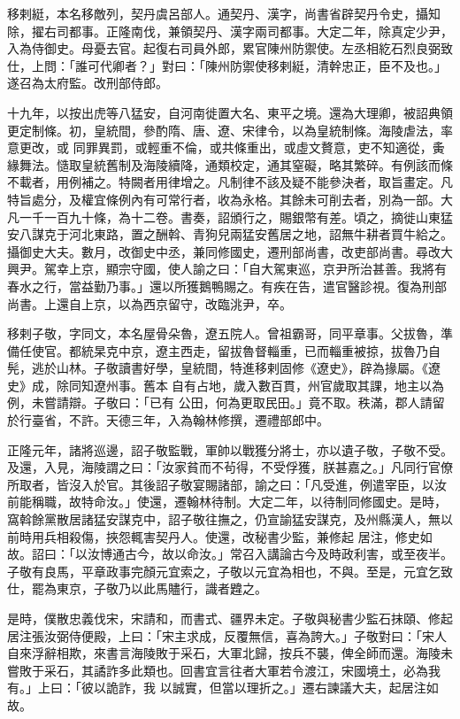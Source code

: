 \begin{pinyinscope}
 移剌綎，本名移敵列，契丹虞呂部人。通契丹、漢字，尚書省辟契丹令史，攝知除，擢右司都事。正隆南伐，兼領契丹、漢字兩司都事。大定二年，除真定少尹，入為侍御史。母憂去官。起復右司員外郎，累官陳州防禦使。左丞相紇石烈良弼致仕，上問：「誰可代卿者？」對曰：「陳州防禦使移剌綎，清幹忠正，臣不及也。」遂召為太府監。改刑部侍郎。



 十九年，以按出虎等八猛安，自河南徙置大名、東平之境。還為大理卿，被詔典領更定制條。初，皇統間，參酌隋、唐、遼、宋律令，以為皇統制條。海陵虐法，率意更改，或
 同罪異罰，或輕重不倫，或共條重出，或虛文贅意，吏不知適從，夤緣舞法。慥取皇統舊制及海陵續降，通類校定，通其窒礙，略其繁碎。有例該而條不載者，用例補之。特闕者用律增之。凡制律不該及疑不能參決者，取旨畫定。凡特旨處分，及權宜條例內有可常行者，收為永格。其餘未可削去者，別為一部。大凡一千一百九十條，為十二卷。書奏，詔頒行之，賜銀幣有差。頃之，摘徙山東猛安八謀克于河北東路，置之酬斡、青狗兒兩猛安舊居之地，詔無牛耕者買牛給之。攝御史大夫。數月，改御史中丞，兼同修國史，遷刑部尚書，改吏部尚書。尋改大
 興尹。駕幸上京，顯宗守國，使人諭之曰：「自大駕東巡，京尹所治甚善。我將有春水之行，當益勤乃事。」還以所獲鵝鴨賜之。有疾在告，遣官醫診視。復為刑部尚書。上還自上京，以為西京留守，改臨洮尹，卒。



 移剌子敬，字同文，本名屋骨朵魯，遼五院人。曾祖霸哥，同平章事。父拔魯，準備任使官。都統杲克中京，遼主西走，留拔魯督輜重，已而輜重被掠，拔魯乃自髡，逃於山林。子敬讀書好學，皇統間，特進移剌固修《遼史》，辟為掾屬。《遼史》成，除同知遼州事。舊本自有占地，歲入數百貫，州官歲取其課，地主以為例，未嘗請辯。子敬曰：「已有
 公田，何為更取民田。」竟不取。秩滿，郡人請留於行臺省，不許。天德三年，入為翰林修撰，遷禮部郎中。



 正隆元年，諸將巡邊，詔子敬監戰，軍帥以戰獲分將士，亦以遺子敬，子敬不受。及還，入見，海陵謂之曰：「汝家貧而不茍得，不受俘獲，朕甚嘉之。」凡同行官僚所取者，皆沒入於官。其後詔子敬宴賜諸部，諭之曰：「凡受進，例遣宰臣，以汝前能稱職，故特命汝。」使還，遷翰林待制。大定二年，以待制同修國史。是時，窩斡餘黨散居諸猛安謀克中，詔子敬往撫之，仍宣諭猛安謀克，及州縣漢人，無以前時用兵相殺傷，挾怨輒害契丹人。使還，改秘書少監，兼修起
 居注，修史如故。詔曰：「以汝博通古今，故以命汝。」常召入講論古今及時政利害，或至夜半。子敬有良馬，平章政事完顏元宜索之，子敬以元宜為相也，不與。至是，元宜乞致仕，罷為東京，子敬乃以此馬贐行，識者韙之。



 是時，僕散忠義伐宋，宋請和，而書式、疆界未定。子敬與秘書少監石抹頤、修起居注張汝弼侍便殿，上曰：「宋主求成，反覆無信，喜為誇大。」子敬對曰：「宋人自來浮辭相欺，來書言海陵敗于采石，大軍北歸，按兵不襲，俾全師而還。海陵未嘗敗于采石，其譎詐多此類也。回書宜言往者大軍若令渡江，宋國境土，必為我有。」上曰：「彼以詭詐，我
 以誠實，但當以理折之。」遷右諫議大夫，起居注如故。




\end{pinyinscope}
